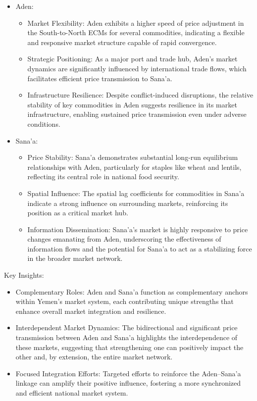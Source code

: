 \begin{itemize}
\item Aden:
  \begin{itemize}
  \item Market Flexibility: Aden exhibits a higher speed of price adjustment in the South-to-North ECMs for several commodities, indicating a flexible and responsive market structure capable of rapid convergence.
  
  \item Strategic Positioning: As a major port and trade hub, Aden's market dynamics are significantly influenced by international trade flows, which facilitates efficient price transmission to Sana'a.
  
  \item Infrastructure Resilience: Despite conflict-induced disruptions, the relative stability of key commodities in Aden suggests resilience in its market infrastructure, enabling sustained price transmission even under adverse conditions.
  \end{itemize}

\item Sana'a:
  \begin{itemize}
  \item Price Stability: Sana'a demonstrates substantial long-run equilibrium relationships with Aden, particularly for staples like wheat and lentils, reflecting its central role in national food security.
  
  \item Spatial Influence: The spatial lag coefficients for commodities in Sana'a indicate a strong influence on surrounding markets, reinforcing its position as a critical market hub.
  
  \item Information Dissemination: Sana'a's market is highly responsive to price changes emanating from Aden, underscoring the effectiveness of information flows and the potential for Sana'a to act as a stabilizing force in the broader market network.
  \end{itemize}
\end{itemize}

Key Insights:
\begin{itemize}
\item Complementary Roles: Aden and Sana'a function as complementary anchors within Yemen's market system, each contributing unique strengths that enhance overall market integration and resilience.
  
\item Interdependent Market Dynamics: The bidirectional and significant price transmission between Aden and Sana'a highlights the interdependence of these markets, suggesting that strengthening one can positively impact the other and, by extension, the entire market network.
  
\item Focused Integration Efforts: Targeted efforts to reinforce the Aden–Sana'a linkage can amplify their positive influence, fostering a more synchronized and efficient national market system.
\end{itemize}